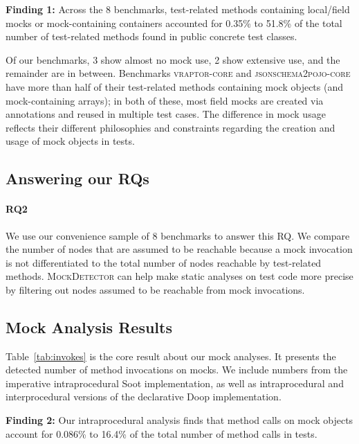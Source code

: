 \begin{mdframed}[
	leftmargin=\parindent,
	rightmargin=\parindent,
	skipabove=\topsep,
	skipbelow=\topsep
	]
	{\bf Finding 1:} Across the 8 benchmarks, test-related methods containing local/field mocks or mock-containing containers accounted for 0.35\% to 51.8\% of the total number of test-related methods found in public concrete test classes.
\end{mdframed}

Of our benchmarks, 3 show almost no mock use, 2 show extensive use, and the remainder are in between. Benchmarks \textsc{vraptor-core} and \textsc{jsonschema2pojo-core} have more than half of their test-related methods containing mock objects (and mock-containing arrays); in both of these, most field mocks are created via annotations and reused in multiple test cases. The difference in mock usage reflects their different philosophies and constraints regarding the creation and usage of mock objects in tests.

\subsection{Answering our RQs}

\paragraph{RQ2} We use our convenience sample of 8 benchmarks to answer this RQ. We compare the number of nodes that are assumed to be reachable
because a mock invocation is not differentiated to the total number of nodes reachable by test-related methods. \textsc{MockDetector} can help make static 
analyses on test code more precise by filtering out nodes assumed to be reachable from mock invocations.


\subsection{Mock Analysis Results}
Table~\ref{tab:invokes} is the core result about our mock analyses. It presents the detected number of method invocations on mocks. We include numbers from the imperative intraprocedural Soot implementation, as well as intraprocedural and interprocedural versions of the declarative Doop implementation.

\begin{mdframed}[
	leftmargin=\parindent,
	rightmargin=\parindent,
	skipabove=\topsep,
	skipbelow=\topsep
	]
	{\bf Finding 2:} Our intraprocedural analysis finds that method calls on mock objects account for 0.086\% to 16.4\% of the total number of method calls in tests. 
\end{mdframed}

